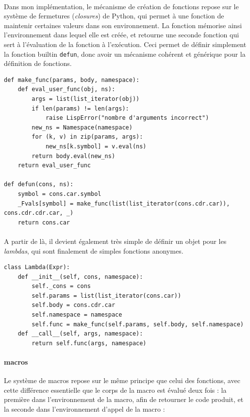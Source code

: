 \documentclass{article}
\begin{document}
\paragraph{}
Dans mon implémentation, le mécanisme de création de fonctions repose sur le système de fermetures (\emph{closures})
de Python, qui permet à une fonction de maintenir certaines valeurs dans son environnement.
La fonction mémorise ainsi l'environnement dans lequel elle est créée, et retourne une seconde fonction qui sert à 
l'évaluation de la fonction à l'exécution. Ceci permet de définir simplement la fonction builtin \texttt{defun}, 
donc avoir un mécanisme cohérent et générique pour la définition de fonctions.

\begin{verbatim}
def make_func(params, body, namespace):
    def eval_user_func(obj, ns):
        args = list(list_iterator(obj))
        if len(params) != len(args):
            raise LispError("nombre d'arguments incorrect")
        new_ns = Namespace(namespace)
        for (k, v) in zip(params, args):
            new_ns[k.symbol] = v.eval(ns)
        return body.eval(new_ns)
    return eval_user_func

def defun(cons, ns):
    symbol = cons.car.symbol
    _Fvals[symbol] = make_func(list(list_iterator(cons.cdr.car)), cons.cdr.cdr.car, _)
    return cons.car
\end{verbatim}

\paragraph{}
A partir de là, il devient également très simple de définir un objet pour les \emph{lambdas}, qui sont 
finalement de simples fonctions anonymes.

\begin{verbatim}
class Lambda(Expr):
    def __init__(self, cons, namespace):
        self._cons = cons
        self.params = list(list_iterator(cons.car))
        self.body = cons.cdr.car
        self.namespace = namespace
        self.func = make_func(self.params, self.body, self.namespace)
    def __call__(self, args, namespace):
        return self.func(args, namespace)
\end{verbatim}

\paragraph{macros}
Le système de macros repose sur le même principe que celui des fonctions, avec cette différence essentielle
que le corps de la macro est évalué deux fois : la première dans l'environnement de la macro, afin de retourner
le code produit, et la seconde dans l'environnement d'appel de la macro :
\end{document}
